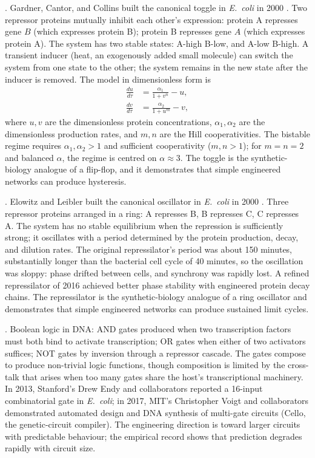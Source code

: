 . Gardner, Cantor, and Collins built the
canonical toggle in \emph{E.\ coli} in 2000
\cite[pp.~339--342]{paper:v6c09-gardner-toggle-2000}. Two repressor proteins
mutually inhibit each other's expression: protein A represses gene
$B$ (which expresses protein B); protein B represses gene $A$ (which
expresses protein A). The system has two stable states: A-high
B-low, and A-low B-high. A transient inducer (heat, an
exogenously added small molecule) can switch the system from one
state to the other; the system remains in the new state after the
inducer is removed. The model in dimensionless form is
\begin{align*}
\frac{du}{d\tau} &= \frac{\alpha_1}{1 + v^n} - u, \\
\frac{dv}{d\tau} &= \frac{\alpha_2}{1 + u^m} - v,
\end{align*}
where $u, v$ are the dimensionless protein concentrations, $\alpha_1,
\alpha_2$ are the dimensionless production rates, and $m, n$ are the
Hill cooperativities. The bistable regime requires $\alpha_1, \alpha_2
> 1$ and sufficient cooperativity ($m, n > 1$); for $m = n = 2$ and
balanced $\alpha$, the regime is centred on $\alpha \approx 3$. The
toggle is the synthetic-biology analogue of a flip-flop, and it
demonstrates that simple engineered networks can produce hysteresis.

. Elowitz and Leibler built the canonical
oscillator in \emph{E.\ coli} in 2000
\cite[pp.~335--338]{paper:v6c09-elowitz-leibler-2000}. Three repressor
proteins arranged in a ring: A represses B, B represses C, C
represses A. The system has no stable equilibrium when the
repression is sufficiently strong; it oscillates with a period
determined by the protein production, decay, and dilution rates.
The original repressilator's period was about 150 minutes,
substantially longer than the bacterial cell cycle of 40 minutes,
so the oscillation was sloppy: phase drifted between cells, and
synchrony was rapidly lost. A refined repressilator
\cite[pp.~93--96]{paper:v6c09-potvin-trottier-repressilator-2016} of 2016
achieved better phase stability with engineered protein decay
chains. The repressilator is the synthetic-biology analogue of a
ring oscillator and demonstrates that simple engineered networks
can produce sustained limit cycles.

. Boolean logic in DNA: AND gates produced
when two transcription factors must both bind to activate
transcription; OR gates when either of two activators suffices; NOT
gates by inversion through a repressor cascade. The gates compose
to produce non-trivial logic functions, though composition is
limited by the cross-talk that arises when too many gates share the
host's transcriptional machinery. In 2013, Stanford's Drew Endy and
collaborators reported a 16-input combinatorial gate in \emph{E.\
coli}; in 2017, MIT's Christopher Voigt and collaborators
demonstrated automated design and DNA synthesis of multi-gate
circuits (Cello, the genetic-circuit compiler). The engineering
direction is toward larger circuits with predictable behaviour; the
empirical record shows that prediction degrades rapidly with
circuit size.

